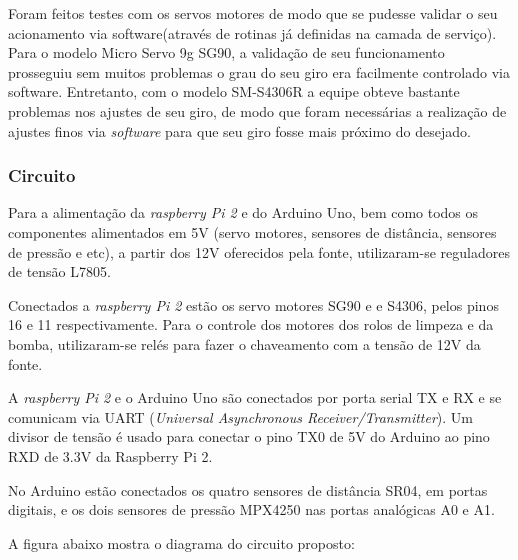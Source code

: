 Foram feitos testes com os servos motores de modo que se pudesse validar o seu acionamento via software(através de rotinas já definidas na camada de serviço). Para o modelo Micro Servo 9g SG90, a validação de seu funcionamento prosseguiu sem muitos problemas o grau do seu giro era facilmente controlado via software. Entretanto, com o modelo SM-S4306R a equipe obteve bastante problemas nos ajustes de seu giro, de modo que foram necessárias a realização de ajustes finos via \textit{software} para que seu giro fosse mais próximo do desejado.

\subsubsection{Circuito}
Para a alimentação da \textit{raspberry Pi 2} e do Arduino Uno, bem como todos os componentes alimentados em 5V (servo motores, sensores de distância, sensores de pressão e etc), a partir dos 12V oferecidos pela fonte, utilizaram-se reguladores de tensão L7805.

Conectados a \textit{raspberry Pi 2} estão os servo motores SG90 e e S4306, pelos pinos 16 e 11 respectivamente. Para o controle dos motores dos rolos de limpeza e da bomba, utilizaram-se relés para fazer o chaveamento com a tensão de 12V da fonte.

A \textit{raspberry Pi 2} e o Arduino Uno são conectados por porta serial TX e RX e se comunicam via UART (\textit{Universal Asynchronous Receiver/Transmitter}). Um divisor de tensão é usado para conectar o pino TX0 de 5V do Arduino ao pino RXD de 3.3V da Raspberry Pi 2.

No Arduino estão conectados os quatro sensores de distância SR04, em portas digitais, e os dois sensores de pressão MPX4250 nas portas analógicas A0 e A1.

A figura abaixo mostra o diagrama do circuito proposto:

